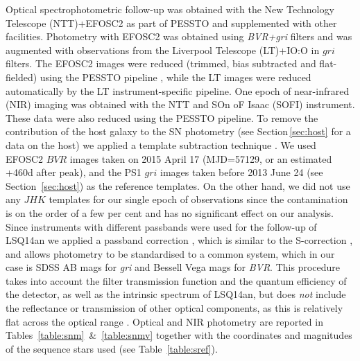 \documentclass[useAMS,usenatbib]{mn2e}
\def\an{LSQ14an}
\begin{document}
Optical spectrophotometric follow-up was  obtained with the New Technology Telescope (NTT)+EFOSC2 as part of PESSTO and supplemented with 
other facilities. Photometry with EFOSC2 was obtained using {\it BVR+gri} filters and was augmented with observations from the Liverpool Telescope (LT)+IO:O in  $ gri$ filters.   
The EFOSC2 images were reduced (trimmed, bias subtracted and flat-fielded) using the PESSTO pipeline \citep{2015A&A...579A..40S}, while the LT images were reduced automatically by the LT instrument-specific pipeline. One epoch of 
near-infrared (NIR) imaging was obtained with the NTT and SOn oF Isaac (SOFI) instrument.
These data were also reduced using the PESSTO pipeline. To remove the 
contribution of the host galaxy to the SN photometry (see Section\,\ref{sec:host} for a data
on the host) we  applied a template subtraction technique \citep[with the {\sc hotpants}\footnote{http://www.astro.washington.edu/users/becker/hotpants.html} package based on the algorithm presented in][]{al00}. We used EFOSC2 $BVR$ images taken on 2015 April 17 
(MJD=57129, or an estimated +460d after peak), 
and the PS1 $gri$ images taken before 2013 June 24 (see Section~\ref{sec:host}) as the reference templates. On the other hand, we did not use any $JHK$ templates for our single epoch of observations since the contamination is on the order of a few per cent and has no significant effect on our analysis. Since instruments with different passbands were used for the follow-up of \an\/ we applied a passband correction \citep[P-correction,][]{in16b}, which is similar to the S-correction \citep{st02,pi04}, and allows  photometry to be standardised to a common system, which in our case is SDSS AB mags for {\it gri} and Bessell Vega mags for {\it BVR}. This procedure takes into account the filter transmission function and the quantum efficiency of the detector, as well as the intrinsic spectrum of \an, but does {\it not} include the reflectance or transmission of other optical components, as this is relatively flat across the optical range \citep[see][for further details]{in16b}.
Optical and NIR photometry are reported in Tables~\ref{table:snm}~\&~\ref{table:snmv} together with the coordinates and magnitudes of the sequence stars used (see Table~\ref{table:sref}). 
\end{document}

